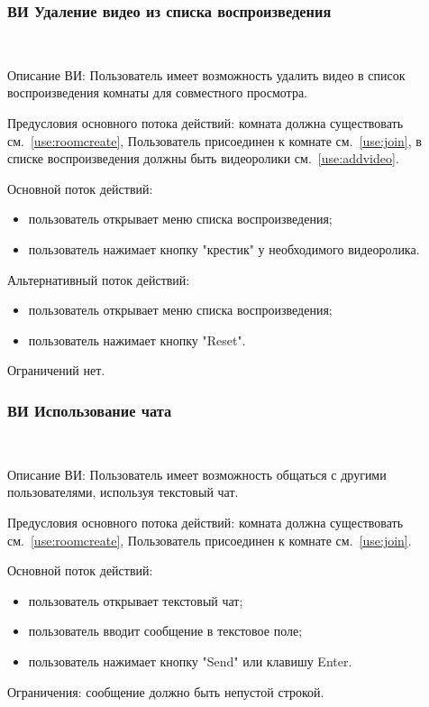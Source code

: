 \subsubsection{ВИ Удаление видео из списка воспроизведения}~\par
Описание ВИ: Пользователь имеет возможность удалить видео в список воспроизведения комнаты для совместного просмотра.
 
Предусловия основного потока действий: комната должна существовать см.~\ref{use:roomcreate}, Пользователь присоединен к комнате см.~\ref{use:join}, в списке воспроизведения должны быть видеоролики см.~\ref{use:addvideo}.
 
Основной поток действий:
\begin{itemize}
   \item пользователь открывает меню списка воспроизведения;
   \item пользователь нажимает кнопку "крестик" у необходимого видеоролика.
\end{itemize}
 
Альтернативный поток действий:
\begin{itemize}
   \item пользователь открывает меню списка воспроизведения;
   \item пользователь нажимает кнопку "Reset".
\end{itemize}
 
Ограничений нет.
 
\subsubsection{ВИ Использование чата}~\par
Описание ВИ: Пользователь имеет возможность общаться с другими пользователями, используя текстовый чат.
 
Предусловия основного потока действий: комната должна существовать см.~\ref{use:roomcreate}, Пользователь присоединен к комнате см.~\ref{use:join}.
 
Основной поток действий:
\begin{itemize}
   \item пользователь открывает текстовый чат;
   \item пользователь вводит сообщение в текстовое поле;
   \item пользователь нажимает кнопку "Send" или клавишу Enter.
\end{itemize}
 
Ограничения: сообщение должно быть непустой строкой.

